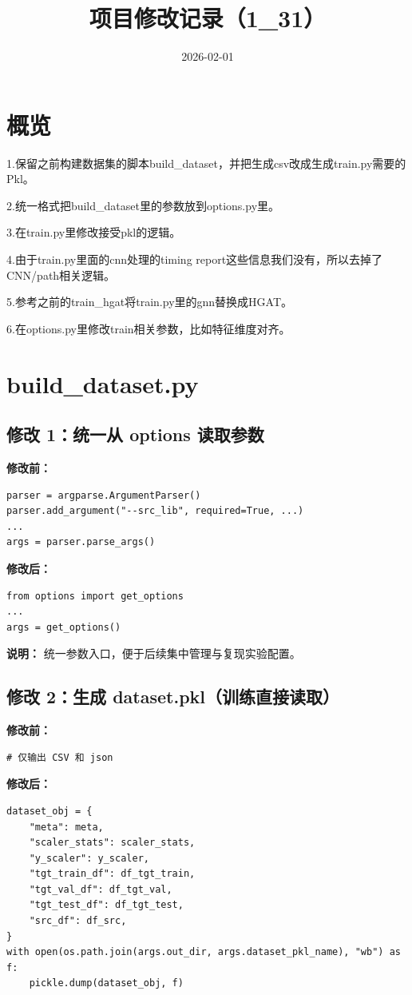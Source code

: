 \documentclass[11pt]{article}
\title{项目修改记录（1\_31）}
\author{}
\date{2026-02-01}
\begin{document}
\maketitle

\section*{概览}
1.保留之前构建数据集的脚本build\_dataset，并把生成csv改成生成train.py需要的Pkl。\par
2.统一格式把build\_dataset里的参数放到options.py里。\par
3.在train.py里修改接受pkl的逻辑。\par
4.由于train.py里面的cnn处理的timing report这些信息我们没有，所以去掉了CNN/path相关逻辑。\par
5.参考之前的train\_hgat将train.py里的gnn替换成HGAT。\par
6.在options.py里修改train相关参数，比如特征维度对齐。\par

\section{build\_dataset.py}
\subsection*{修改 1：统一从 options 读取参数}
\textbf{修改前：}
\begin{lstlisting}
parser = argparse.ArgumentParser()
parser.add_argument("--src_lib", required=True, ...)
...
args = parser.parse_args()
\end{lstlisting}

\textbf{修改后：}
\begin{lstlisting}
from options import get_options
...
args = get_options()
\end{lstlisting}

\textbf{说明：} 统一参数入口，便于后续集中管理与复现实验配置。

\subsection*{修改 2：生成 dataset.pkl（训练直接读取）}
\textbf{修改前：}
\begin{lstlisting}
# 仅输出 CSV 和 json
\end{lstlisting}

\textbf{修改后：}
\begin{lstlisting}
dataset_obj = {
    "meta": meta,
    "scaler_stats": scaler_stats,
    "y_scaler": y_scaler,
    "tgt_train_df": df_tgt_train,
    "tgt_val_df": df_tgt_val,
    "tgt_test_df": df_tgt_test,
    "src_df": df_src,
}
with open(os.path.join(args.out_dir, args.dataset_pkl_name), "wb") as f:
    pickle.dump(dataset_obj, f)
\end{lstlisting}
\end{document}
